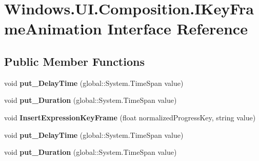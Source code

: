 \hypertarget{interface_windows_1_1_u_i_1_1_composition_1_1_i_key_frame_animation}{}\section{Windows.\+U\+I.\+Composition.\+I\+Key\+Frame\+Animation Interface Reference}
\label{interface_windows_1_1_u_i_1_1_composition_1_1_i_key_frame_animation}
\subsection*{Public Member Functions}
\begin{DoxyCompactItemize}
\item 
\mbox{\label{interface_windows_1_1_u_i_1_1_composition_1_1_i_key_frame_animation_afda841ad947daa1748f93094624d94fe}} 
void {\bfseries put\+\_\+\+Delay\+Time} (global\+::\+System.\+Time\+Span value)
\item 
\mbox{\label{interface_windows_1_1_u_i_1_1_composition_1_1_i_key_frame_animation_a9f28c784eceb2f438715f41aa5fd2f6b}} 
void {\bfseries put\+\_\+\+Duration} (global\+::\+System.\+Time\+Span value)
\item 
\mbox{\label{interface_windows_1_1_u_i_1_1_composition_1_1_i_key_frame_animation_a0a6d3909f5a9a1a7d69b6a98a89d7487}} 
void {\bfseries Insert\+Expression\+Key\+Frame} (float normalized\+Progress\+Key, string value)
\item 
\mbox{\label{interface_windows_1_1_u_i_1_1_composition_1_1_i_key_frame_animation_afda841ad947daa1748f93094624d94fe}} 
void {\bfseries put\+\_\+\+Delay\+Time} (global\+::\+System.\+Time\+Span value)
\item 
\mbox{\label{interface_windows_1_1_u_i_1_1_composition_1_1_i_key_frame_animation_a9f28c784eceb2f438715f41aa5fd2f6b}} 
void {\bfseries put\+\_\+\+Duration} (global\+::\+System.\+Time\+Span value)

\end{DoxyCompactItemize}
